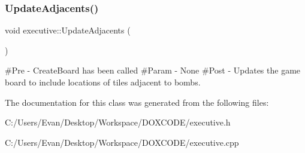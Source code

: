 \subsubsection{\texorpdfstring{UpdateAdjacents()}{UpdateAdjacents()}}
{\footnotesize\ttfamily void executive\+::\+Update\+Adjacents (\begin{DoxyParamCaption}{ }\end{DoxyParamCaption})}

\#\+Pre -\/ Create\+Board has been called \#\+Param -\/ None \#\+Post -\/ Updates the game board to include locations of tiles adjacent to bombs. 

The documentation for this class was generated from the following files\+:\begin{DoxyCompactItemize}
\item 
C\+:/\+Users/\+Evan/\+Desktop/\+Workspace/\+D\+O\+X\+C\+O\+D\+E/executive.\+h\item 
C\+:/\+Users/\+Evan/\+Desktop/\+Workspace/\+D\+O\+X\+C\+O\+D\+E/executive.\+cpp\end{DoxyCompactItemize}
